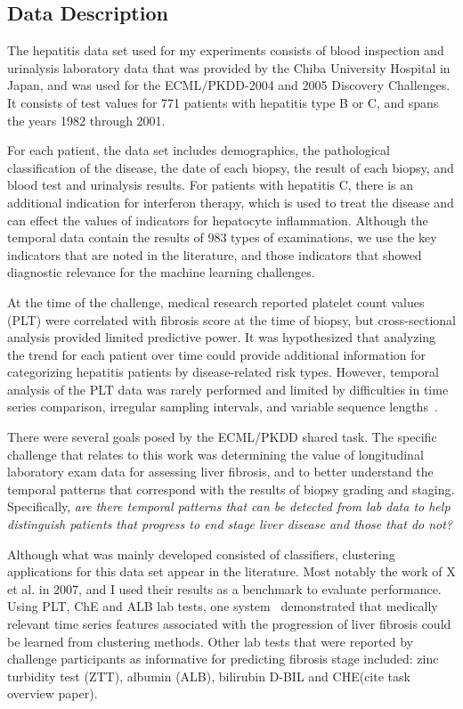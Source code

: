 \subsection{Data Description}
The hepatitis data set used for my experiments consists of blood inspection and urinalysis laboratory data that was provided by the Chiba University Hospital in Japan, and was used for the ECML/PKDD-2004 and 2005 Discovery Challenges.  It consists of test values for 771 patients with hepatitis type B or C, and spans the years 1982 through 2001.

For each patient, the data set includes demographics, the pathological classification of the disease, the date of each biopsy, the result of each biopsy, and blood test and urinalysis results.  For patients with hepatitis C, there is an additional indication for interferon therapy, which is used to treat the disease and can effect the values of indicators for hepatocyte inflammation.  Although the temporal data contain the results of 983 types of examinations, we use the key indicators that are noted in the literature, and those indicators that showed diagnostic relevance for the machine learning challenges.

At the time of the challenge, medical research reported platelet count values (PLT) were correlated with fibrosis score at the time of biopsy, but cross-sectional analysis provided limited predictive power.  It was hypothesized that analyzing the trend for each patient over time could provide additional information for categorizing hepatitis patients by disease-related risk types.  However, temporal analysis of the PLT data was rarely performed and limited by difficulties in time series comparison, irregular sampling intervals, and variable sequence lengths~\cite{Shoji05}.

There were several goals posed by the ECML/PKDD shared task.  The specific challenge that relates to this work was determining the value of longitudinal laboratory exam data for assessing liver fibrosis, and to better understand the temporal patterns that correspond with the results of biopsy grading and staging.  Specifically, \emph{are there temporal patterns that can be detected from lab data to help distinguish patients that progress to end stage liver disease and those that do not?}

Although what was mainly developed consisted of classifiers, clustering applications for this data set appear in the literature.  Most notably the work of X et al. in 2007, and I used their results as a benchmark to evaluate performance.  Using PLT, ChE and ALB lab tests, one system~\cite{Hirano05,Hirano07a, Hirano07b,Tsumoto12} demonstrated that medically relevant time series features associated with the progression of liver fibrosis could be learned from clustering methods.  Other lab tests that were reported by challenge participants as informative for predicting fibrosis stage included: zinc turbidity test (ZTT), albumin (ALB), bilirubin D-BIL and CHE(cite task overview paper). 